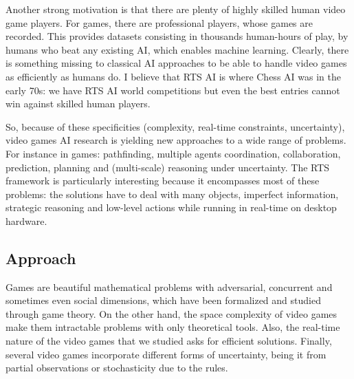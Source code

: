 Another strong motivation is that there are plenty of highly skilled human video game players. For  games, there are professional players, whose games are recorded. This provides datasets consisting in thousands human-hours of play, by humans who beat any existing AI, which enables machine learning. Clearly, there is something missing to classical AI approaches to be able to handle video games as efficiently as humans do. I believe that RTS AI is where Chess AI was in the early 70s: we have RTS AI world competitions but even the best entries cannot win against skilled human players.


So, because of these specificities (complexity, real-time constraints, uncertainty), video games AI research is yielding new approaches to a wide range of problems. For instance in  games: pathfinding, multiple agents coordination, collaboration, prediction, planning and (multi-scale) reasoning under uncertainty. The RTS framework is particularly interesting because it encompasses most of these problems: the solutions have to deal with many objects, imperfect information, strategic reasoning and low-level actions while running in real-time on desktop hardware.


\subsection{Approach}
Games are beautiful mathematical problems with adversarial, concurrent and sometimes even social dimensions, which have been formalized and studied through game theory. %
On the other hand, the space complexity of video games make them intractable problems with only theoretical tools. Also, the real-time nature of the video games that we studied asks for efficient solutions. Finally, several video games incorporate different forms of uncertainty, being it from partial observations or stochasticity due to the rules.

